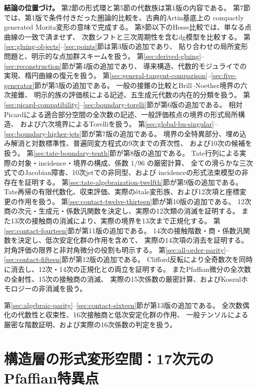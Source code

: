 \medskip
\noindent\textbf{結論の位置づけ。}
第2節の形式環と第5節の代数族は第1版の内容である。
第7節では、第1版で条件付きだった圏論的比較を、古典的Artin基底上の
compactly generated Morita変形の意味で完成する。
第8節以下のHesse比較では、単なる点曲線の一致で済ませず、
次数シフトと三次周期性を含むdg模型を比較する。
第\ref{sec:gluing-objects}--\ref{sec:points}節は第3版の追加であり、
貼り合わせの局所変形問題と、明示的な点加群スキームを扱う。
第\ref{sec:derived-gluing}--\ref{sec:reconstruction}節が第4版の追加であり、
導来構造、代数的モジュライでの実現、楕円曲線の復元を扱う。
第\ref{sec:general-tangent-comparison}--\ref{sec:five-generator}節が第5版の追加である。
一般の接錐の比較とBrill--Noether境界の六次接錐、
明示的族の評価核による記述、五生成元代数の内在的分類を扱う。
第\ref{sec:picard-compatibility}--\ref{sec:boundary-torelli}節が第6版の追加である。
相対Picardによる適合部分空間の全次数の記述、一般評価核点の境界の形式局所構造、
および六次境界によるTorelliを扱う。
第\ref{sec:global-bn-singular}--\ref{sec:boundary-higher-jets}節が第7版の追加である。
境界の全特異部分、埋め込み解消と対数標準性、普遍同変方程式の9次までの斉次性、
および10次の候補を扱う。
第\ref{sec:tate-boundary-tenth}節が第8版の追加である。
Tate行列による実際の対象・incidence・境界の構成、係数 $1/96$ の厳密計算、
全ての滑らかな三次式でのJacobian障害、10次jetでの非同型、および
incidenceの形式法束模型の非存在を証明する。
第\ref{sec:tate-algebraization-twelfth}節が第9版の追加である。
Tate再帰の有限代数化、収束評価、実際のétale変形族、および12次項と座標変更の作用を扱う。
第\ref{sec:contact-twelve-thirteen}節が第10版の追加である。
12次商の次元・生成元・係数汎関数を決定し、実際の12次類の消滅を証明する。
また13次の接触商の消滅により、実際の境界を13次まで正規化する。
第\ref{sec:contact-fourteen}節が第11版の追加である。
14次の接触階数・商・係数汎関数を決定し、低次安定化群の作用を含めて、
実際の14次項の消去を証明する。対角評価の限界と非対角微分の役割も明示する。
第\ref{sec:all-order-parity}--\ref{sec:contact-fifteen}節が第12版の追加である。
Clifford反転により全奇数次を同時に消去し、12次・14次の正規化との両立を証明する。
またPfaffian微分の全次数の全射性、15次の接触商の消滅、
実際の15次係数の厳密計算、およびKoszulホモロジーの非消滅を扱う。

第\ref{sec:algebraic-parity}--\ref{sec:contact-sixteen}節が第13版の追加である。
全次数偶化の代数性と収束性、16次接触商と低次安定化群の作用、
一般テンソルによる厳密な階数証明、および実際の16次係数の判定を扱う。




\section{構造層の形式変形空間：17次元のPfaffian特異点}

